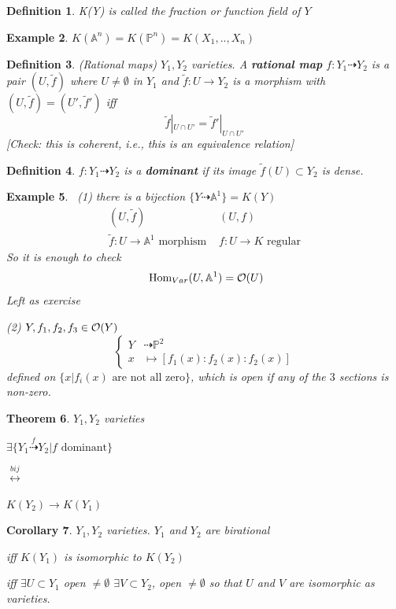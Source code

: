 \documentclass[11pt]{article}
\newtheorem{thm}{Theorem}[section]
\newtheorem{cor}[thm]{Corollary}
\newtheorem{dfn}[thm]{Definition}
\newtheorem{ex}[thm]{Example}
\renewcommand{\hom}{\text{ Hom}}
\newcommand{\affn}{\mathbb A}
\newcommand{\proj}{\mathbb P}
\newcommand{\calo}{{\cal O}}
\newcommand{\lrta}{\longrightarrow}
\newcommand{\llrta}{\longleftrightarrow}
\begin{document}
\begin{dfn}
K(Y) is called the fraction or function field of $Y$
\end{dfn}

\begin{ex}
$K(\affn^n)=K(\proj^n)=K(X_1,..,X_n)$
\end{ex}

\begin{dfn}
(Rational maps) $Y_1,Y_2$ varieties. A \textbf{rational map} $f: Y_1\dashrightarrow Y_2$ is a pair $(U,\tilde{f})$ where $U\neq \emptyset$ in $Y_1$ and $\tilde{f}:U\lrta Y_2$ is a morphism with $(U,\tilde{f})=(U',\tilde{f}')$ iff 
$$
\tilde{f}|_{U\cap U'}=\tilde{f}'|_{U\cap U'}
$$
[Check: this is coherent, i.e., this is an equivalence relation]
\end{dfn}

\begin{dfn}
$f:Y_1\dashrightarrow Y_2$ is a \textbf{dominant} if its image $\tilde{f}(U)\subset Y_2$ is dense.
\end{dfn}

\begin{ex}\ 
(1) there is a bijection $\{Y\dashrightarrow \affn^1\}=K(Y)$
$$
\begin{matrix}
(U,\tilde{f}) & (U,f)\\
\tilde{f}:U\lrta \affn^1\text{ morphism } & f: U\lrta K\text{ regular}
\end{matrix}
$$
So it is enough to check 
$$
\hom_{Var}(U,\affn^1)=\calo(U)
$$
Left as exercise

(2) $Y,f_1,f_2,f_3\in\calo(Y)$
$$
\left\{\begin{aligned}
Y&\dashrightarrow \proj^2\\
x&\longmapsto [f_1(x):f_2(x):f_2(x)]
\end{aligned}\right.
$$
defined on $\{x|f_i (x) \text{ are not all zero}\}$, which is open if any of the $3$ sections is non-zero.
\end{ex}
\begin{thm}
$Y_1,Y_2$ varieties

$\exists \{Y_1\overset{f}{\dashrightarrow} Y_2|f \text{ dominant}\}$

$\overset{bij}{\llrta}$

$K(Y_2)\lrta K(Y_1)$
\end{thm}

\begin{cor}
$Y_1, Y_2$ varieties. $Y_1$ and $Y_2$ are birational 

iff $K(Y_1)$ is isomorphic to $K(Y_2)$

iff $\exists U\subset Y_1$ open $\neq \emptyset$
$\exists V\subset Y_2$, open $\neq \emptyset$ so that $U$ and $V$ are isomorphic as varieties.
\end{cor}
\end{document}
